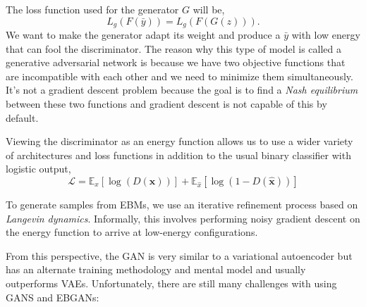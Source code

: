 \documentclass{article}
\begin{document}
The loss function used for the generator $G$ will be,
\[
    L_g(F(\bar y)) = L_g(F(G(z))).
\]
We want to make the generator adapt its weight and produce a $\bar{y}$ with low energy that can fool the discriminator. The reason why this type of model is called a generative adversarial network is because we have two objective functions that are incompatible with each other and we need to minimize them simultaneously. It’s not a gradient descent problem because the goal is to find a \textit{Nash equilibrium} between these two functions and gradient descent is not capable of this by default. 

Viewing the discriminator as an energy function allows us to use a wider variety of architectures and loss functions in addition to the usual binary classifier with logistic output,
\[
    \mathcal{L} = \mathbb{E}_x [\log(D(\boldsymbol{x} ))] + \mathbb{E}_{\hat{x}}[\log(1-D(\boldsymbol{\hat{x}}))] 
\]

To generate samples from EBMs, we use an iterative refinement process based on \textit{Langevin dynamics}. Informally, this involves performing noisy gradient descent on the energy function to arrive at low-energy configurations.

From this perspective, the GAN is very similar to a variational autoencoder but has an alternate training methodology and mental model and usually outperforms VAEs. Unfortunately, there are still many challenges with using GANS and EBGANs:
\end{document}
